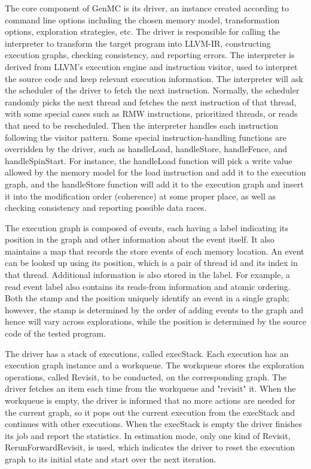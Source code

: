 The core component of GenMC is its driver, an instance created according to command line options including the chosen memory model, transformation options, exploration strategies, etc. The driver is responsible for calling the interpreter to transform the target program into LLVM-IR, constructing execution graphs, checking consistency, and reporting errors. The interpreter is derived from LLVM's execution engine and instruction visitor, used to interpret the source code and keep relevant execution information. The interpreter will ask the scheduler of the driver to fetch the next instruction. Normally, the scheduler randomly picks the next thread and fetches the next instruction of that thread, with some special cases such as RMW instructions, prioritized threads, or reads that need to be rescheduled. Then the interpreter handles each instruction following the visitor pattern. Some special instruction-handling functions are overridden by the driver, such as handleLoad, handleStore, handleFence, and handleSpinStart. For instance, the handleLoad function will pick a write value allowed by the memory model for the load instruction and add it to the execution graph, and the handleStore function will add it to the execution graph and insert it into the modification order (coherence) at some proper place, as well as checking consistency and reporting possible data races.

The execution graph is composed of events, each having a label indicating its position in the graph and other information about the event itself. It also maintains a map that records the store events of each memory location. An event can be looked up using its position, which is a pair of thread id and its index in that thread. Additional information is also stored in the label. For example, a read event label also contains its reads-from information and atomic ordering. Both the stamp and the position uniquely identify an event in a single graph; however, the stamp is determined by the order of adding events to the graph and hence will vary across explorations, while the position is determined by the source code of the tested program.

The driver has a stack of executions, called execStack. Each execution has an execution graph instance and a workqueue. The workqueue stores the exploration operations, called Revisit, to be conducted, on the corresponding graph. The driver fetches an item each time from the workqueue and "revisit" it. When the workqueue is empty, the driver is informed that no more actions are needed for the current graph, so it pops out the current execution from the execStack and continues with other executions. When the execStack is empty the driver finishes its job and report the statistics. In estimation mode, only one kind of Revisit, RerunForwardRevisit, is used, which indicates the driver to reset the execution graph to its initial state and start over the next iteration.

